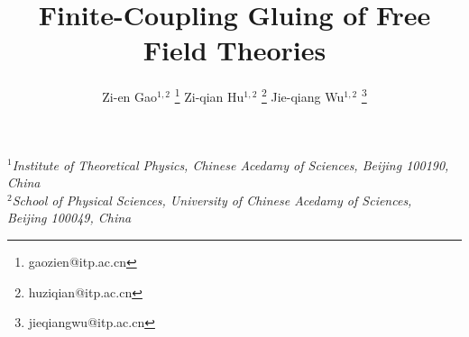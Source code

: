 \title{\textbf{Finite-Coupling Gluing of Free Field Theories}}
\author{
Zi-en Gao${}^{1,2}$ \footnote{gaozien@itp.ac.cn}
Zi-qian Hu${}^{1,2}$ \footnote{huziqian@itp.ac.cn}
Jie-qiang Wu${}^{1,2}$ \footnote{jieqiangwu@itp.ac.cn}
}
\date{}
\maketitle

\begin{center}
{\it
$^{1}$Institute of Theoretical Physics, Chinese Acedamy of Sciences, Beijing 100190, China \\
$^{2}$School of Physical Sciences, University of Chinese Acedamy of Sciences, \\ Beijing 100049, China
}
\end{center}
